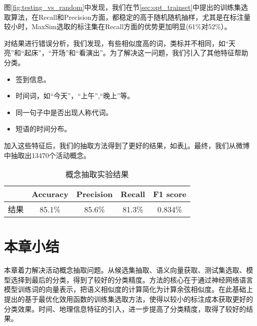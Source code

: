 图\ref{fig:testing_vs_random}中发现，我们在节\ref{sec:opt_trainset}中提出的训练集选取算法，在Recall和Precision方面，都稳定的高于随机随机抽样，尤其是在标注量较小时，MaxSim选取的标注集在Recall方面的优势更加明显(61\%对52\%）。

对结果进行错误分析，我们发现，有些相似度高的词，类标并不相同，如``天亮''和``起床''，``开场''和``看演出''。为了解决这一问题，我们引入了其他特征帮助分类。
\begin{itemize}
\item 签到信息。
\item 时间词，如``今天''，``上午'',``晚上''等。
\item 同一句子中是否出现人称代词。
\item 短语的时间分布。
\end{itemize}
加入这些特征后，我们的抽取方法得到了更好的结果，如表\ref{table:concept}。最终，我们从微博中抽取出13470个活动概念。

\begin{table}
\centering
\begin{tabular}{|c|c|c|c|c}
\hline
 & Accuracy & Precision & Recall & F1 score \\
\hline
结果 & 85.1\% & 85.6\% & 81.3\% & 0.834\% \\
\hline
\end{tabular}
\caption{概念抽取实验结果}
\label{table:concept}
\end{table}

\section{本章小结}
本章着力解决活动概念抽取问题。从候选集抽取、语义向量获取、测试集选取、模型选择到最后的分类，得到了较好的分类精度。方法的核心在于通过神经网络语言模型训练词的向量表示，把语义相似度的计算简化为计算余弦相似度。在此基础上提出的基于最优化效用函数的训练集选取方法，使得以较小的标注成本获取更好的分类效果。时间、地理信息特征的引入，进一步提高了分类精度，取得了较好的结果。

